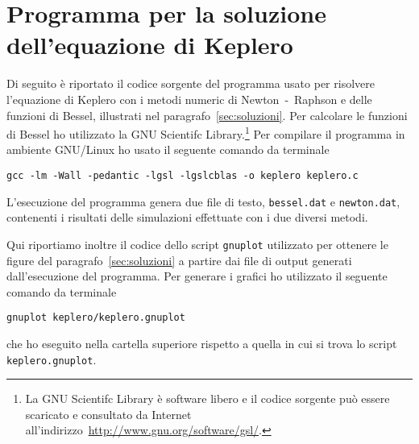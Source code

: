 \chapter{Programma per la soluzione dell'equazione di Keplero}
\label{cha:soluzione-keplero}

Di seguito è riportato il codice sorgente del programma usato per risolvere
l'equazione di Keplero con i metodi numeric di Newton~-~Raphson e delle funzioni
di Bessel, illustrati nel paragrafo~\ref{sec:soluzioni}. Per calcolare le
funzioni di Bessel ho utilizzato la GNU Scientifc Library.\footnote{La GNU
  Scientifc Library è software libero e il codice sorgente può essere scaricato
  e consultato da Internet
  all'indirizzo~\url{http://www.gnu.org/software/gsl/}.} Per compilare il
programma in ambiente GNU/Linux ho usato il seguente comando da terminale
\begin{verbatim}
gcc -lm -Wall -pedantic -lgsl -lgslcblas -o keplero keplero.c
\end{verbatim}
L'esecuzione del programma genera due file di testo, \verb|bessel.dat| e
\verb|newton.dat|, contenenti i risultati delle simulazioni effettuate con i due
diversi metodi.
% 

Qui riportiamo inoltre il codice dello script \verb|gnuplot| utilizzato per
ottenere le figure del paragrafo~\ref{sec:soluzioni} a partire dai file di
output generati dall'esecuzione del programma. Per generare i grafici ho
utilizzato il seguente comando da terminale
\begin{verbatim}
gnuplot keplero/keplero.gnuplot
\end{verbatim}
che ho eseguito nella cartella superiore rispetto a quella in cui si trova lo
script \verb|keplero.gnuplot|.


